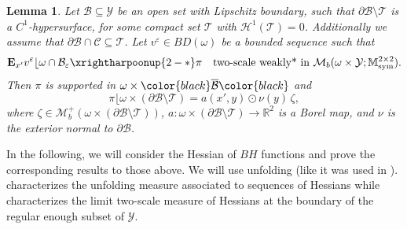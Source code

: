 \documentclass[reqno,10pt]{amsart}
\numberwithin{equation}{section}
\newtheorem{lemma}[theorem]{Lemma}
\theoremstyle{remark}
\newcommand{\RED}{\color{black}}
\newcommand{\BLACK}{\color{black}}
\newcommand{\calB}{\mathcal{B}}
\newcommand{\calC}{\mathcal{C}}
\newcommand{\calH}{\mathcal{H}}
\newcommand{\M}{\mathbb{M}}
\newcommand{\R}{\mathbb{R}}
\newcommand{\calT}{\mathcal{T}}
\newcommand{\calY}{\mathcal{Y}}
\DeclareMathOperator{\sym}{sym}
\newcommand{\closure}[1]{\overline{#1}}
\newcommand{\weakstartwoscale}{\xrightharpoonup{2-*}}
\newcommand{\eps}{\varepsilon}
\newcommand{\Mb}{\mathcal{M}_b}
\newcommand{\mres}[1]{\lfloor{#1}}
\newcommand{\E}{{\bf E}}
\begin{document}
\begin{lemma} \label{two-scale rank-1 lemma BD}
Let $\calB \subseteq \calY$ be an open set with Lipschitz boundary, such that $\partial\calB \setminus \calT$ is a $C^1$-hypersurface, for some compact set $\calT$ with $\calH^{1}(\calT) = 0$. 
Additionally we assume that $\partial\calB \cap \calC \subseteq \calT$. 
Let $v^\eps \in BD(\omega)$ be a bounded sequence such that 
\begin{equation*}
	{\E}_{x'}v^\eps\mres{\omega \cap \calB_\eps} \weakstartwoscale \pi \quad \text{two-scale weakly* in $\Mb(\omega \times \calY;\M^{2 \times 2}_{\sym})$}.
\end{equation*}
Then $\pi$ is supported in $\omega \times {\RED\closure{\calB}\BLACK}$ and
\begin{equation} \label{two-scale rank-1 structure BD}
	\pi\mres{\omega \times (\partial\calB \setminus \calT)} = a(x',y) \odot \nu(y) \,\zeta,
\end{equation}
where $\zeta \in \Mb^+(\omega \times (\partial\calB \setminus \calT))$, $a : \omega \times (\partial\calB \setminus \calT) \to \R^2$ is a Borel map, and $\nu$ is the exterior normal to $\partial\calB$.
\end{lemma}

In the following, we will consider the Hessian of $BH$ functions and prove the corresponding results to those above. 
We will use unfolding (like it was used in \cite{Francfort.Giacomini.2014}).  characterizes the unfolding measure associated to sequences of Hessians while  characterizes the limit two-scale measure of Hessians at the boundary of the regular enough subset of $\calY$. 

\end{document}
